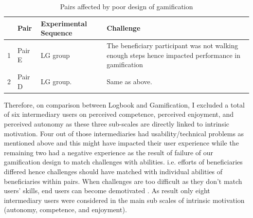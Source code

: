 \begin{table}
  \begin{center}
    \caption{Pairs affected by poor design of gamification}
    \label{table:negexprnce}
	\begin{tabular}{|l|l|l|p{6cm}|}
		\hline
		&Pair&Experimental Sequence&Challenge\\
		\hline
		1&Pair E&LG group & The beneficiary participant was not walking enough steps hence impacted performance in gamification\\
		\hline
		2&Pair D & LG group.& Same as above.\\
	\hline
	\end{tabular}
  \end{center}
\end{table}
\newline 
Therefore, on comparison between Logbook and Gamification, I excluded a total of six intermediary users on perceived competence, perceived enjoyment, and perceived autonomy as these three sub-scales are directly linked to intrinsic motivation. Four out of those  intermediaries had usability/technical problems as mentioned above and this might have impacted their user experience while the remaining two had a negative experience as the result of failure of our gamification design to match challenges with abilities. i.e. efforts of beneficiaries differed hence challenges should have matched with individual abilities of beneficiaries within pairs. When challenges are too difficult as they don't match users' skills, end users can become demotivated \citep{zhang2008motivational}. As result only eight intermediary users were considered in the main sub scales of intrinsic motivation (autonomy, competence, and enjoyment). 
 

